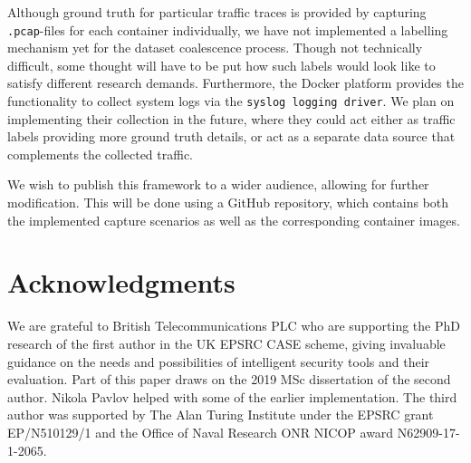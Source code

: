 \documentclass[sigconf]{acmart}
\begin{document}
Although ground truth for particular traffic traces is provided by capturing \texttt{.pcap}-files for each container individually, we have not implemented a labelling mechanism yet for the dataset coalescence process. Though not technically difficult, some thought will have to be put how such labels would look like to satisfy different research demands.
Furthermore, the Docker platform provides the functionality to collect system logs via the \texttt{syslog logging driver}. We plan on implementing their collection in the future, where they could act either as traffic labels providing more ground truth details, or act as a separate data source that complements the collected traffic.

We wish to publish this framework to a wider audience, allowing for further modification. This will be done using a GitHub repository, which contains both the implemented capture scenarios as well as the corresponding container images.




\section{Acknowledgments}

We are grateful to  British Telecommunications PLC who are supporting the PhD research of the first
author in the UK EPSRC CASE scheme, giving invaluable guidance on the
needs and possibilities of intelligent security tools and their
evaluation.  Part of this paper draws on the 2019 MSc dissertation of
the second author.  %
Nikola Pavlov helped with some of the earlier implementation.  The
third author was supported by The Alan Turing Institute under the
EPSRC grant EP/N510129/1 and the Office of Naval Research ONR NICOP
award N62909-17-1-2065.




 
\end{document}
